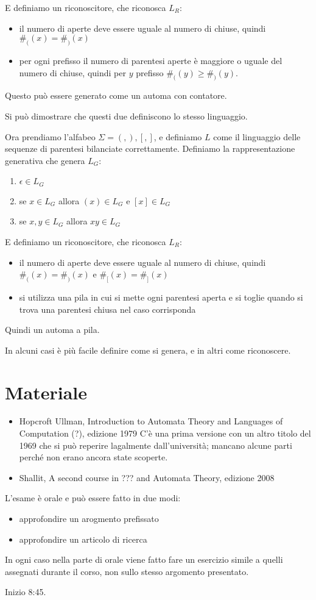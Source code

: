 \documentclass[12pt]{article}
\begin{document}
\begin{itemize}
		E definiamo un riconoscitore, che riconosca $L_R$:
		\begin{itemize}
			\item il numero di aperte deve essere uguale al numero di chiuse, quindi $\#_((x) = \#_)(x)$
			\item per ogni prefisso il numero di parentesi aperte è maggiore o uguale del numero di chiuse, quindi per $y$ prefisso $\#_((y) \geq \#_)(y)$.
		\end{itemize}
		Questo può essere generato come un automa con contatore.

		Si può dimostrare che questi due definiscono lo stesso linguaggio. 

		Ora prendiamo l'alfabeo $\Sigma = {(, ), [, ]}$, e definiamo $L$ come il linguaggio delle sequenze di parentesi bilanciate correttamente.
		Definiamo la rappresentazione generativa che genera $L_G$:
		\begin{enumerate}
			\item $\epsilon \in L_G$
			\item se $x \in L_G$ allora $(x) \in L_G$ e $[x] \in L_G$
			\item se $x, y \in L_G$ allora $xy \in L_G$
		\end{enumerate}

		E definiamo un riconoscitore, che riconosca $L_R$:
		\begin{itemize}
			\item il numero di aperte deve essere uguale al numero di chiuse, quindi $\#_((x) = \#_)(x)$ e $\#_[(x) = \#_](x)$
			\item si utilizza una pila in cui si mette ogni parentesi aperta e si toglie quando si trova una parentesi chiusa nel caso corrisponda
		\end{itemize}
		Quindi un automa a pila.

		In alcuni casi è più facile definire come si genera, e in altri come riconoscere.
\end{itemize}

\section{Materiale}
\begin{itemize}
	\item Hopcroft Ullman, Introduction to Automata Theory and Languages of Computation (?), edizione 1979
		C'è una prima versione con un altro titolo del 1969 che si può reperire lagalmente dall'università; mancano alcune parti perché non erano ancora state scoperte.
	\item Shallit, A second course in ??? and Automata Theory, edizione 2008
\end{itemize}
L'esame è orale e può essere fatto in due modi:
\begin{itemize}
	\item approfondire un arogmento prefissato
	\item approfondire un articolo di ricerca
\end{itemize}
In ogni caso nella parte di orale viene fatto fare un esercizio simile a quelli assegnati durante il corso, non sullo stesso argomento presentato.

Inizio 8:45.
\end{document}
